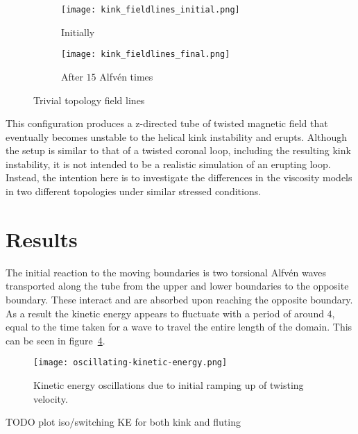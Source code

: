 \begin{figure}[t]
  \centering
  \begin{subfigure}{.45\textwidth}
  \centering
  \texttt{[image: kink\_fieldlines\_initial.png]}
  \caption{Initially}
  \label{fig:initial_kink_field}
  \end{subfigure}
  \begin{subfigure}{.45\textwidth}
  \centering
  \texttt{[image: kink\_fieldlines\_final.png]}
  \caption{After $15$ Alfv\'en times}
  \label{fig:twisted_kink_field}
  \end{subfigure}
  
  \caption{Trivial topology field lines}
  \label{fig:kink_field_lines}
\end{figure}

This configuration produces a z-directed tube of twisted magnetic field that eventually becomes unstable to the helical kink instability and erupts. Although the setup is similar to that of a twisted coronal loop, including the resulting kink instability, it is not intended to be a realistic simulation of an erupting loop. Instead, the intention here is to investigate the differences in the viscosity models in two different topologies under similar stressed conditions.

\section{Results}

The initial reaction to the moving boundaries is two torsional Alfv\'en waves transported along the tube from the upper and lower boundaries to the opposite boundary. These interact and are absorbed upon reaching the opposite boundary. As a result the kinetic energy appears to fluctuate with a period of around $4$, equal to the time taken for a wave to travel the entire length of the domain. This can be seen in figure~\ref{fig:oscillating-kinetic-energy}.

\begin{figure}[t]
  \centering
  \texttt{[image: oscillating-kinetic-energy.png]}
  \caption{Kinetic energy oscillations due to initial ramping up of twisting velocity.}
  \label{fig:oscillating-kinetic-energy}
\end{figure}

TODO plot iso/switching KE for both kink and fluting

